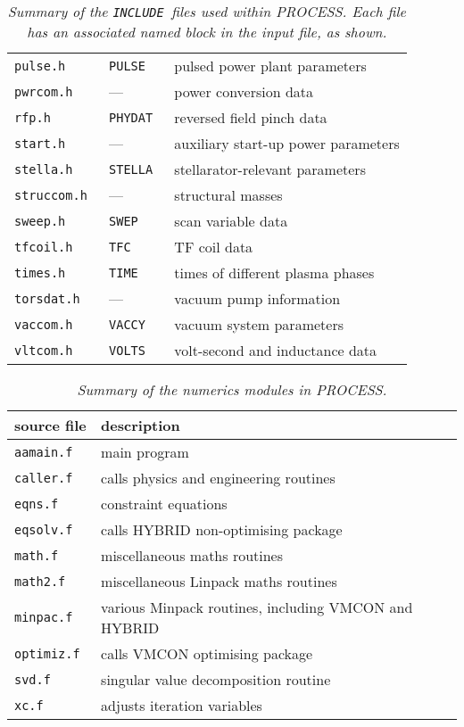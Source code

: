 \documentclass[11pt,a4paper]{report}
\makeatletter
\newcommand{\PSD}{\mbox{\it PROCESS}\@.\/ }
\newcommand{\INCLUDE}{\mbox{\tt INCLUDE }}
\makeatother
\begin{document}
\begin{table}
\begin{center}
\begin{tabular}{||l|l||l||}
\tt pulse.h     & \tt PULSE            & pulsed power plant parameters \\
\tt pwrcom.h    &     ---              & power conversion data \\
\tt rfp.h       & \tt PHYDAT           & reversed field pinch data \\
\tt start.h     &     ---              & auxiliary start-up power parameters \\
\tt stella.h    & \tt STELLA           & stellarator-relevant parameters \\
\tt struccom.h  &     ---              & structural masses \\
\tt sweep.h     & \tt SWEP             & scan variable data \\
\tt tfcoil.h    & \tt TFC              & TF coil data \\
\tt times.h     & \tt TIME             & times of different plasma phases \\
\tt torsdat.h   &     ---              & vacuum pump information \\
\tt vaccom.h    & \tt VACCY            & vacuum system parameters \\
\tt vltcom.h    & \tt VOLTS            & volt-second and inductance data \\
\hline
\end{tabular}
\end{center}
\caption[TABLE_INC]{{\it
Summary of the \INCLUDE files used within \PSD Each file has an
associated named block in the input file, as shown.
}}
\label{tab:includes}
\end{table}


\begin{table}
\begin{center}

\begin{tabular}{||l||l||} \hline
source file   & description \\ \hline
\tt aamain.f  & \rm main program \\
\tt caller.f  & \rm calls physics and engineering routines \\
\tt eqns.f    & \rm constraint equations \\
\tt eqsolv.f  & \rm calls HYBRID non-optimising package \\
\tt math.f    & \rm miscellaneous maths routines \\
\tt math2.f   & \rm miscellaneous Linpack maths routines \\
\tt minpac.f  & \rm various Minpack routines, including VMCON and HYBRID \\
\tt optimiz.f & \rm calls VMCON optimising package \\
\tt svd.f     & \rm singular value decomposition routine \\
\tt xc.f      & \rm adjusts iteration variables \\ \hline
\end{tabular}
\end{center}
\caption[TABLE_NUM]{{\it
Summary of the numerics modules in \PSD
}}
\label{tab:numerics}
\end{table}
\end{document}
